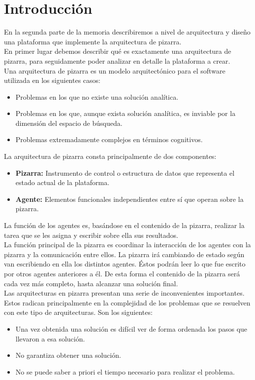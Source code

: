 \chapter{Introducción}
\lettrine[lines=1,slope=4pt,findent=0pt]{E}{}n la segunda parte de la memoria describiremos a nivel de arquitectura y diseño una plataforma que implemente la arquitectura de pizarra. \\

En primer lugar debemos describir qué es exactamente una arquitectura de pizarra, para seguidamente poder analizar en detalle la plataforma a crear.\\

Una arquitectura de pizarra es un modelo arquitectónico para el software utilizada en los siguientes casos:

\begin{itemize}
	\item Problemas en los que no existe una solución analítica.
	\item Problemas en los que, aunque exista solución analítica, es inviable por la dimensión del espacio de búsqueda.
	\item Problemas extremadamente complejos en términos cognitivos.
\end{itemize}

La arquitectura de pizarra consta principalmente de dos componentes:

\begin{itemize}
	\item \textbf{Pizarra: }Instrumento de control o estructura de datos que representa el estado actual de la plataforma.
	\item \textbf{Agente: }Elementos funcionales independientes entre sí que operan sobre la pizarra.
\end{itemize}

La función de los agentes es, basándose en el contenido de la pizarra, realizar la tarea que se les asigna y escribir sobre ella sus resultados.\\

La función principal de la pizarra es coordinar la interacción de los agentes con la pizarra y la comunicación entre ellos. La pizarra irá cambiando de estado según van escribiendo en ella los distintos agentes. Éstos podrán leer lo que fue escrito por otros agentes anteriores a él. De esta forma el contenido de la pizarra será cada vez más completo, hasta alcanzar una solución final.\\

Las arquitecturas en pizarra presentan una serie de inconvenientes importantes. Estos radican principalmente en la complejidad de los problemas que se resuelven con este tipo de arquitecturas. Son los siguientes:

\begin{itemize}
	\item Una vez obtenida una solución es difícil ver de forma ordenada los pasos que llevaron a esa solución.
	\item No garantiza obtener una solución.
	\item No se puede saber a priori el tiempo necesario para realizar el problema.
\end{itemize}